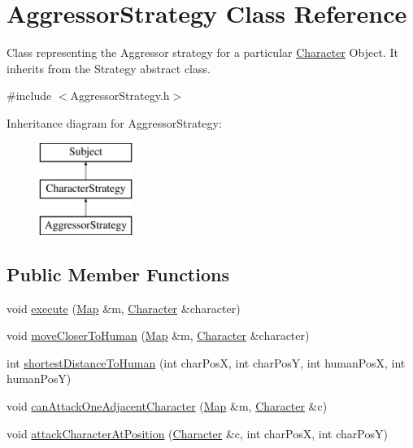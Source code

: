 \hypertarget{class_aggressor_strategy}{}\section{Aggressor\+Strategy Class Reference}
\label{class_aggressor_strategy}


Class representing the Aggressor strategy for a particular \hyperlink{class_character}{Character} Object. It inherits from the Strategy abstract class.  




{\ttfamily \#include $<$Aggressor\+Strategy.\+h$>$}

Inheritance diagram for Aggressor\+Strategy\+:\begin{figure}[H]
\begin{center}
\leavevmode
\includegraphics[height=3.000000cm]{class_aggressor_strategy}
\end{center}
\end{figure}
\subsection*{Public Member Functions}
\begin{DoxyCompactItemize}
\item 
void \hyperlink{class_aggressor_strategy_a64de03f063f8b195da7134965148f1c8}{execute} (\hyperlink{class_map}{Map} \&m, \hyperlink{class_character}{Character} \&character)
\item 
void \hyperlink{class_aggressor_strategy_a375f0346535b7a684f5222780d1cfde9}{move\+Closer\+To\+Human} (\hyperlink{class_map}{Map} \&m, \hyperlink{class_character}{Character} \&character)
\item 
int \hyperlink{class_aggressor_strategy_aff8804c562838466c0bc7dd5a7abcbb5}{shortest\+Distance\+To\+Human} (int char\+PosX, int char\+PosY, int human\+PosX, int human\+PosY)
\item 
void \hyperlink{class_aggressor_strategy_ab086a8a043aa9e00b43f52e2ec8c428b}{can\+Attack\+One\+Adjacent\+Character} (\hyperlink{class_map}{Map} \&m, \hyperlink{class_character}{Character} \&c)
\item 
void \hyperlink{class_aggressor_strategy_a9b27ee4123b38c807ad247ebe2a1a65f}{attack\+Character\+At\+Position} (\hyperlink{class_character}{Character} \&c, int char\+PosX, int char\+PosY)
\end{DoxyCompactItemize}


